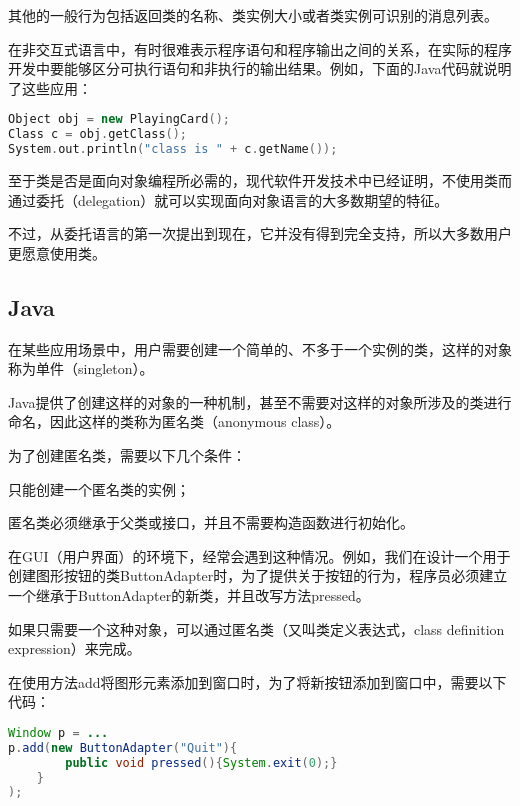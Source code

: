 其他的一般行为包括返回类的名称、类实例大小或者类实例可识别的消息列表。

在非交互式语言中，有时很难表示程序语句和程序输出之间的关系，在实际的程序开发中要能够区分可执行语句和非执行的输出结果。例如，下面的Java代码就说明了这些应用：




\begin{lstlisting}[language=C++]
Object obj = new PlayingCard();
Class c = obj.getClass();
System.out.println("class is " + c.getName());
\end{lstlisting}

至于类是否是面向对象编程所必需的，现代软件开发技术中已经证明，不使用类而通过委托（delegation）就可以实现面向对象语言的大多数期望的特征。

不过，从委托语言的第一次提出到现在，它并没有得到完全支持，所以大多数用户更愿意使用类。


\subsection{Java}

在某些应用场景中，用户需要创建一个简单的、不多于一个实例的类，这样的对象称为单件（singleton）。


Java提供了创建这样的对象的一种机制，甚至不需要对这样的对象所涉及的类进行命名，因此这样的类称为匿名类（anonymous class）。

为了创建匿名类，需要以下几个条件：

\begin{compactenum}
\item 只能创建一个匿名类的实例；
\item 匿名类必须继承于父类或接口，并且不需要构造函数进行初始化。
\end{compactenum}

在GUI（用户界面）的环境下，经常会遇到这种情况。例如，我们在设计一个用于创建图形按钮的类ButtonAdapter时，为了提供关于按钮的行为，程序员必须建立一个继承于ButtonAdapter的新类，并且改写方法pressed。

如果只需要一个这种对象，可以通过匿名类（又叫类定义表达式，class definition expression）来完成。

在使用方法add将图形元素添加到窗口时，为了将新按钮添加到窗口中，需要以下代码：


\begin{lstlisting}[language=Java]
Window p = ...
p.add(new ButtonAdapter("Quit"){
		public void pressed(){System.exit(0);}
	}
);
\end{lstlisting}

